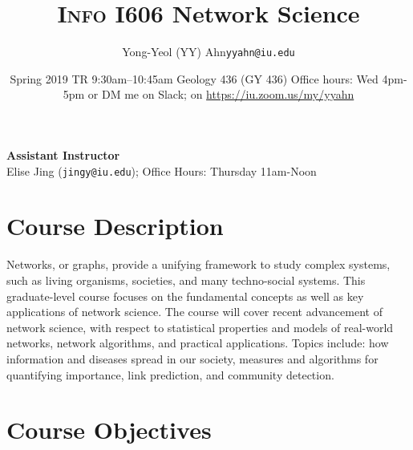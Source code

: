 \documentclass[11pt,article,oneside]{memoir} %
\makeatletter
\def\myauthor{Author}
\def\mytitle{Title}
\def\myemail{yyahn@iu.edu}
\def\myauthor{Yong-Yeol (YY) Ahn}
\def\mytitle{{\normalsize \textsc{Info} I606 \newline} \HUGE Network Science}
\makeatother
\begin{document}


\def\ind{\hangindent=1 true cm\hangafter=1 \noindent}
\def\labelitemi{$\cdot$}


\title{\LARGE \mytitle}
\author{\Large\myauthor \newline \footnotesize\texttt{\noindent\myemail}}
\date{Spring 2019 %
\newline TR 9:30am--10:45am
\newline Geology 436 (GY 436)
\newline Office hours: Wed 4pm-5pm or DM me on Slack; on \url{https://iu.zoom.us/my/yyahn}}

\maketitle
\vspace{-20pt}
{\bfseries Assistant Instructor} \\ Elise Jing (\texttt{jingy@iu.edu}); Office Hours: Thursday 11am-Noon

\section{Course Description} %

Networks, or graphs, provide a unifying framework to study complex systems, such as living organisms, societies, and many techno-social systems.
This graduate-level course focuses on the fundamental concepts as well as key applications of network science.
The course will cover recent advancement of network science, with respect to statistical properties and models of real-world networks, network algorithms, and practical applications.
Topics include: how information and diseases spread in our society, measures and algorithms for quantifying importance, link prediction, and community detection.


\section{Course Objectives} %
\end{document}
